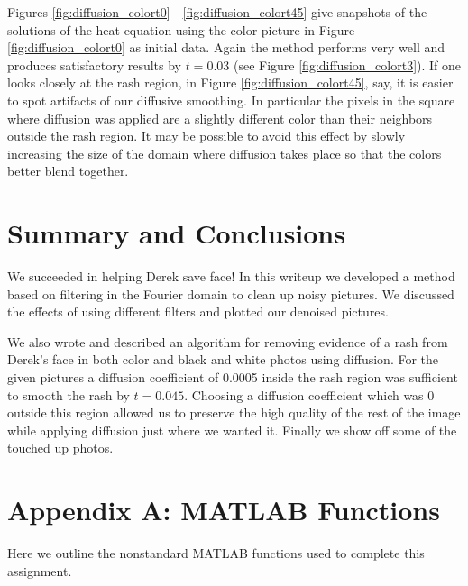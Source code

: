 \documentclass[fleqn,10pt]{../SelfArx} %
\begin{document}
Figures \ref{fig:diffusion_colort0} - \ref{fig:diffusion_colort45} give snapshots of the solutions of the heat equation using the color picture in Figure \ref{fig:diffusion_colort0} as initial data. Again the method performs very well and produces satisfactory results by $t=0.03$ (see Figure \ref{fig:diffusion_colort3}). If one looks closely at the rash region, in Figure \ref{fig:diffusion_colort45}, say, it is easier to spot artifacts of our diffusive smoothing. In particular the pixels in the square where diffusion was applied are a slightly different color than their neighbors outside the rash region. It may be possible to avoid this effect by slowly increasing the size of the domain where diffusion takes place so that the colors better blend together.


\section{Summary and Conclusions} %
\label{sec:summary_and_conclusions}
We succeeded in helping Derek save face! In this writeup we developed a method based on filtering in the Fourier domain to clean up noisy pictures. We discussed the effects of using different filters and plotted our denoised pictures. %

 We also wrote and described an algorithm for removing evidence of a rash from Derek's face in both color and black and white photos using diffusion. For the given pictures a diffusion coefficient of 0.0005 inside the rash region was sufficient to smooth the rash by $t=0.045$. Choosing a diffusion coefficient which was 0 outside this region allowed us to preserve the high quality of the rest of the image while applying diffusion just where we wanted it. Finally we show off some of the touched up photos.





\section*{Appendix A: MATLAB Functions} %
Here we outline the nonstandard MATLAB functions used to complete this assignment.
\vskip 0.5cm
\end{document}
